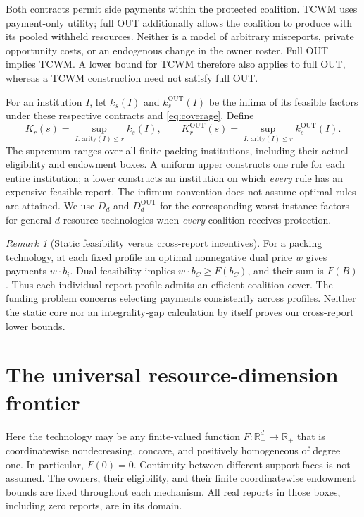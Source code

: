 \documentclass[11pt]{article}
\newcommand{\R}{\mathbb R}
\theoremstyle{definition}\newtheorem{definition}[theorem]{Definition}
\theoremstyle{remark}\newtheorem{remark}[theorem]{Remark}
\begin{document}
Both contracts permit side payments within the protected coalition. TCWM
uses payment-only utility; full OUT additionally allows the coalition to
produce with its pooled withheld resources. Neither is a model of arbitrary
misreports, private opportunity costs, or an endogenous change in the owner
roster. Full OUT implies TCWM. A lower bound for TCWM therefore also applies
to full OUT, whereas a TCWM construction need not satisfy full OUT.

For an institution $I$, let $k_s(I)$ and $k_s^{\mathrm{OUT}}(I)$ be the
infima of its feasible factors under these respective contracts and
\eqref{eq:coverage}. Define
\begin{equation}\label{eq:frontiers}
 K_r(s)=\sup_{I:\,\text{arity}(I)\le r} k_s(I),\qquad
 K_r^{\mathrm{OUT}}(s)=\sup_{I:\,\text{arity}(I)\le r}
 k_s^{\mathrm{OUT}}(I).
\end{equation}
The supremum ranges over all finite packing institutions, including their
actual eligibility and endowment boxes. A uniform upper constructs one rule
for each entire institution; a lower constructs an institution on which
\emph{every} rule has an expensive feasible report. The infimum convention
does not assume optimal rules are attained. We use $D_d$ and
$D_d^{\mathrm{OUT}}$ for the corresponding worst-instance factors for general
$d$-resource technologies when \emph{every} coalition receives protection.

\begin{remark}[Static feasibility versus cross-report incentives]\label{rem:static}
For a packing technology, at each fixed profile an optimal nonnegative dual
price $w$ gives payments $w\cdot b_i$. Dual feasibility implies
$w\cdot b_C\ge F(b_C)$, and their sum is $F(B)$.
Thus each individual report profile admits an efficient coalition cover.
The funding problem concerns selecting payments consistently across profiles.
Neither the static core nor an integrality-gap calculation by itself proves
our cross-report lower bounds.
\end{remark}


\section{The universal resource-dimension frontier}
\label{dim:section}

Here the technology may be any finite-valued function
$F:\R_+^d\to\R_+$ that is coordinatewise nondecreasing, concave, and
positively homogeneous of degree one. In particular, $F(0)=0$.
Continuity between different support faces is not assumed.
The owners, their eligibility, and their finite coordinatewise endowment
bounds are fixed throughout each mechanism. All real reports in those
boxes, including zero reports, are in its domain.
\end{document}
